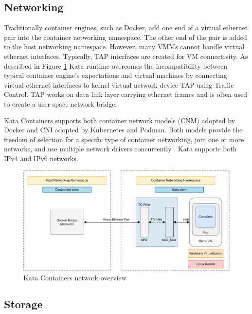 \subsection{Networking}

Traditionally container engines, such as Docker, add one end of a virtual ethernet pair into the container networking namespace. The other end of the pair is added to the host networking namespace. However, many VMMs cannot handle virtual ethernet interfaces. Typically, TAP interfaces are created for VM connectivity. As described in Figure \ref{fig:KataContainersNetwork} Kata runtime overcomes the incompatibility between typical container engine's expectations and virtual machines by connecting virtual ethernet interfaces to kernel virtual network device TAP using Traffic Control. TAP works on data link layer carrying ethernet frames and is often used to create a user-space network bridge. \cite{KataContainersArchitecture}

Kata Containers supports both container network models (CNM) adopted by Docker and CNI adopted by Kubernetes and Podman. Both models provide the freedom of selection for a specific type of container networking, join one or more networks, and use multiple network drivers concurrently \cite{Randazzo2019}. Kata supports both IPv4 and IPv6 networks.

\begin{figure}[ht]
  \begin{center}
    \includegraphics[width=13.5cm]{images/KataContainersNetwork.pdf}
    \caption{Kata Containers network overview \cite{KataContainersArchitecture}}
    \label{fig:KataContainersNetwork}
  \end{center}
\end{figure}

\subsection{Storage}

